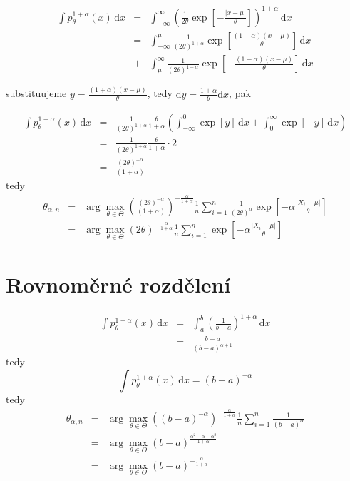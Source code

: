 \documentclass[11pt]{article}
\newcommand{\intpa}{\int p_\theta^{1+\alpha}(x) \, \mathrm{d}x }
\newcommand{\amtiT}{\arg \max_{\theta \in \Theta}}
\begin{document}
\begin{eqnarray}
\intpa & = & \int_{-\infty }^{\infty } \left( {\frac{1}{2\theta} \exp{ \left[ -\frac{|x -\mu |}{\theta } \right] }} \right) ^{1 + \alpha} \, \mathrm{d}x \nonumber\\
 & = & \int_{-\infty }^{\mu } {\frac{1}{ (2\theta)^{ 1 + \alpha}} \exp{ \left[ \frac{(1 + \alpha )(x -\mu )}{\theta } \right] }} \, \mathrm{d}x \nonumber\\
 & + & \int_{\mu }^{\infty } {\frac{1}{ (2\theta)^{ 1 + \alpha}} \exp{ \left[ -\frac{(1 + \alpha )(x -\mu )}{\theta } \right] }} \, \mathrm{d}x \nonumber
\end{eqnarray} 

substituujeme $ y = \frac{(1+\alpha)(x-\mu)}{\theta} $, tedy $\mathrm{d}y = \frac{1+\alpha}{\theta}\mathrm{d}x $, pak

\begin{eqnarray}
\intpa & = & \frac{1}{ (2\theta)^{ 1 + \alpha}} \frac{\theta}{1+\alpha} \left( 
\int_{-\infty }^{0 } {\exp{ \left[ y \right] }} \, \mathrm{d}x + 
\int_{0 }^{\infty } {\exp{ \left[ -y \right] }} \, \mathrm{d}x \right) \nonumber\\
& = & \frac{1}{ (2\theta)^{ 1 + \alpha}} \frac{\theta}{1+\alpha} \cdot 2  \nonumber\\
& = & \frac{(2\theta)^{-\alpha}}{(1+\alpha)} 
\end{eqnarray}
tedy 
\begin{eqnarray}
	\theta_{\alpha,n} &= &\amtiT \left( \frac{(2\theta)^{-\alpha}}{(1+\alpha)}  \right)^{-\frac{\alpha}{1+\alpha}} \frac{1}{n} \sum_{i=1}^n \frac{1}{(2\theta)^{\alpha}} \exp \left[-\alpha\frac{|X_i-\mu|}{\theta} \right] \nonumber\\
	&=& \amtiT (2\theta)^{-\frac{\alpha}{1+\alpha}} \frac{1}{n} \sum_{i=1}^n \exp \left[-\alpha\frac{|X_i-\mu|}{\theta} \right]
\end{eqnarray}


\section{Rovnoměrné rozdělení}

\begin{eqnarray}
\intpa & = & \int_{a }^{b } \left( \frac{1}{b-a} \right) ^{1 + \alpha} \, \mathrm{d}x \nonumber\\
& = & \frac{b-a}{(b-a)^{\alpha+1}} \nonumber
\end{eqnarray} 
tedy
\begin{equation}
\intpa = (b-a)^{-\alpha}
\end{equation}
tedy 
\begin{eqnarray}
	\theta_{\alpha,n} & = & \amtiT \left( (b-a)^{-\alpha} \right)^{-\frac{\alpha}{1+\alpha}} \frac{1}{n} \sum_{i=1}^n \frac{1}{(b-a)^\alpha} \nonumber\\
	& = & \amtiT (b-a)^{\frac{\alpha^2 - \alpha - \alpha^2}{1+\alpha}}	\nonumber\\
	& = & \amtiT  (b-a)^{-\frac{\alpha}{1+\alpha}}
\end{eqnarray}
\end{document}
